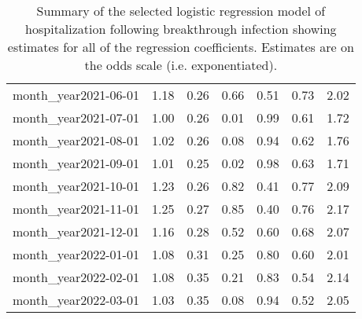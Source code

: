 \begin{table}[!htbp]
\begin{tabular}{lrrrrrr}
  month\_year2021-06-01 & 1.18 & 0.26 & 0.66 & 0.51 & 0.73 & 2.02 \\ 
  month\_year2021-07-01 & 1.00 & 0.26 & 0.01 & 0.99 & 0.61 & 1.72 \\ 
  month\_year2021-08-01 & 1.02 & 0.26 & 0.08 & 0.94 & 0.62 & 1.76 \\ 
  month\_year2021-09-01 & 1.01 & 0.25 & 0.02 & 0.98 & 0.63 & 1.71 \\ 
  month\_year2021-10-01 & 1.23 & 0.26 & 0.82 & 0.41 & 0.77 & 2.09 \\ 
  month\_year2021-11-01 & 1.25 & 0.27 & 0.85 & 0.40 & 0.76 & 2.17 \\ 
  month\_year2021-12-01 & 1.16 & 0.28 & 0.52 & 0.60 & 0.68 & 2.07 \\ 
  month\_year2022-01-01 & 1.08 & 0.31 & 0.25 & 0.80 & 0.60 & 2.01 \\ 
  month\_year2022-02-01 & 1.08 & 0.35 & 0.21 & 0.83 & 0.54 & 2.14 \\ 
  month\_year2022-03-01 & 1.03 & 0.35 & 0.08 & 0.94 & 0.52 & 2.05 \\ 
   \hline
\end{tabular}
\caption{Summary of the selected logistic regression model of hospitalization following breakthrough infection showing estimates for all of the regression coefficients. Estimates are on the odds scale (i.e. exponentiated).} 
\label{tab:summary_logistic_hospital}
\end{table}
